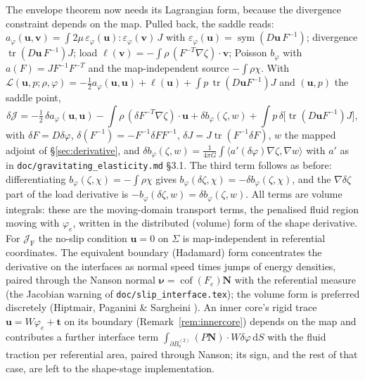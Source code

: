 \documentclass[11pt]{article}
\newcommand{\Jf}{\mathscr{J}}  %
\newcommand{\eps}{\varepsilon}
\newcommand{\Bs}{B_{\mathrm{s}}}
\newcommand{\bu}{\mathbf{u}}
\newcommand{\bv}{\mathbf{v}}
\newcommand{\bN}{\mathbf{N}}
\newcommand{\bnu}{\bm{\nu}}
\newcommand{\dS}{\,\mathrm{d}S}
\newcommand{\tr}{\operatorname{tr}}
\newcommand{\sym}{\operatorname{sym}}
\newcommand{\cof}{\operatorname{cof}}
\newcommand{\ip}[2]{\langle #1, #2\rangle}
\newcommand{\JF}{\Jf _{\mathrm{F}}}
\begin{document}
The envelope theorem now needs its Lagrangian form, because the
divergence constraint depends on the map. Pulled back, the saddle reads:
$a_\varphi(\bu,\bv) = \int 2\mu\,\eps_\varphi(\bu):\eps_\varphi(\bv)\,J$
with $\eps_\varphi(\bu) = \sym(D\bu\,F^{-1})$; divergence
$\tr(D\bu\,F^{-1})J$; load $\ell(\bv) = -\int\rho\,(F^{-T}\nabla\zeta)
\cdot\bv$; Poisson $b_\varphi$ with $a(F) = JF^{-1}F^{-T}$ and the
map-independent source $-\int\rho\chi$. With
$\mathcal{L}(\bu,p;\rho,\varphi) = -\tfrac12a_\varphi(\bu,\bu) +
\ell(\bu) + \int p\,\tr(D\bu F^{-1})J$ and $(\bu,p)$ the saddle point,
\begin{equation}
  \delta \Jf  = -\tfrac12\,\delta a_\varphi(\bu,\bu)
  - \int\rho\,(\delta F^{-T}\nabla\zeta)\cdot\bu
  + \delta b_\varphi(\zeta, w)
  + \int p\,\delta\bigl[\tr(D\bu F^{-1})J\bigr] ,
  \label{eq:shape-derivative}
\end{equation}
with $\delta F = D\delta\varphi$, $\delta(F^{-1}) = -F^{-1}\delta F F^{-1}$,
$\delta J = J\tr(F^{-1}\delta F)$, $w$ the mapped adjoint of
\S\ref{sec:derivative}, and $\delta b_\varphi(\zeta,w) = \frac{1}{4\pi G}
\int\ip{a'(\delta\varphi)\nabla\zeta}{\nabla w}$ with $a'$ as in
\texttt{doc/gravitating\_elasticity.md} \S3.1. The third term follows as
before: differentiating $b_\varphi(\zeta,\chi) = -\int\rho\chi$ gives
$b_\varphi(\delta\zeta,\chi) = -\delta b_\varphi(\zeta,\chi)$, and the
$\nabla\delta\zeta$ part of the load derivative is $-b_\varphi(\delta\zeta,w) =
\delta b_\varphi(\zeta,w)$. All terms are volume integrals: these are the
moving-domain transport terms, the penalised fluid region moving with
$\varphi_e$, written in the distributed (volume) form of the shape
derivative. For $\JF$ the no-slip condition $\bu = 0$ on $\Sigma$ is
map-independent in referential coordinates. The equivalent boundary
(Hadamard) form concentrates the derivative on the interfaces as normal
speed times jumps of energy densities, paired through the Nanson normal
$\bnu = \cof(F_e)\bN$ with the referential measure (the Jacobian
warning of \texttt{doc/slip\_interface.tex}); the volume form is
preferred discretely (Hiptmair, Paganini \& Sargheini
\cite{HiptmairPaganiniSargheini2015}). An inner core's rigid trace
$\bu = W\varphi_e + \mathbf{t}$ on its boundary (Remark~\ref{rem:innercore})
depends on the map and contributes a further interface term
$\int_{\partial\Bs^{(2)}}(P\bN)\cdot W\delta\varphi\dS$ with the fluid
traction per referential area, paired through Nanson; its sign, and the
rest of that case, are left to the shape-stage implementation.
\end{document}

